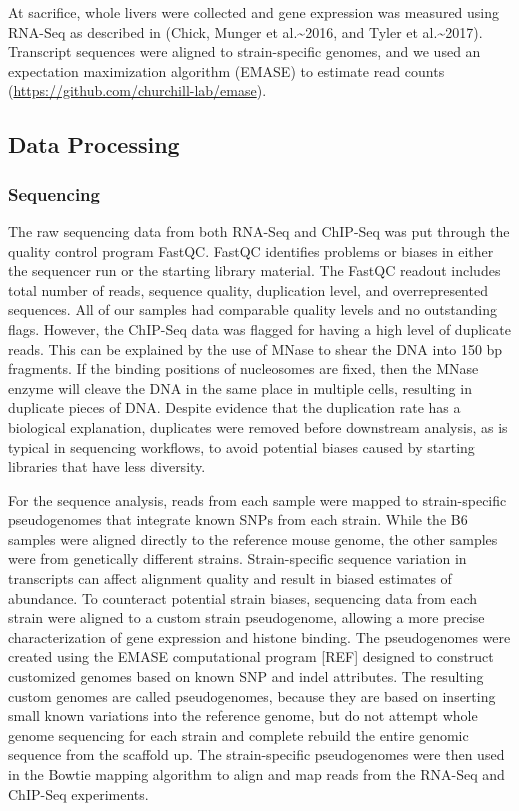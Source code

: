 \documentclass[10pt,letterpaper]{article}
\begin{document}
At sacrifice, whole livers were collected and gene expression was
measured using RNA-Seq as described in (Chick, Munger et
al.\textasciitilde2016, and Tyler et al.\textasciitilde2017). Transcript
sequences were aligned to strain-specific genomes, and we used an
expectation maximization algorithm (EMASE) to estimate read counts
(\url{https://github.com/churchill-lab/emase}).

\hypertarget{data-processing}{%
\subsection{Data Processing}\label{data-processing}}

\hypertarget{sequencing}{%
\subsubsection{Sequencing}\label{sequencing}}

The raw sequencing data from both RNA-Seq and ChIP-Seq was put through
the quality control program FastQC. FastQC identifies problems or biases
in either the sequencer run or the starting library material. The FastQC
readout includes total number of reads, sequence quality, duplication
level, and overrepresented sequences. All of our samples had comparable
quality levels and no outstanding flags. However, the ChIP-Seq data was
flagged for having a high level of duplicate reads. This can be
explained by the use of MNase to shear the DNA into 150 bp fragments. If
the binding positions of nucleosomes are fixed, then the MNase enzyme
will cleave the DNA in the same place in multiple cells, resulting in
duplicate pieces of DNA. Despite evidence that the duplication rate has
a biological explanation, duplicates were removed before downstream
analysis, as is typical in sequencing workflows, to avoid potential
biases caused by starting libraries that have less diversity.

For the sequence analysis, reads from each sample were mapped to
strain-specific pseudogenomes that integrate known SNPs from each
strain. While the B6 samples were aligned directly to the reference
mouse genome, the other samples were from genetically different strains.
Strain-specific sequence variation in transcripts can affect alignment
quality and result in biased estimates of abundance. To counteract
potential strain biases, sequencing data from each strain were aligned
to a custom strain pseudogenome, allowing a more precise
characterization of gene expression and histone binding. The
pseudogenomes were created using the EMASE computational program
{[}REF{]} designed to construct customized genomes based on known SNP
and indel attributes. The resulting custom genomes are called
pseudogenomes, because they are based on inserting small known
variations into the reference genome, but do not attempt whole genome
sequencing for each strain and complete rebuild the entire genomic
sequence from the scaffold up. The strain-specific pseudogenomes were
then used in the Bowtie mapping algorithm to align and map reads from
the RNA-Seq and ChIP-Seq experiments.
\end{document}
